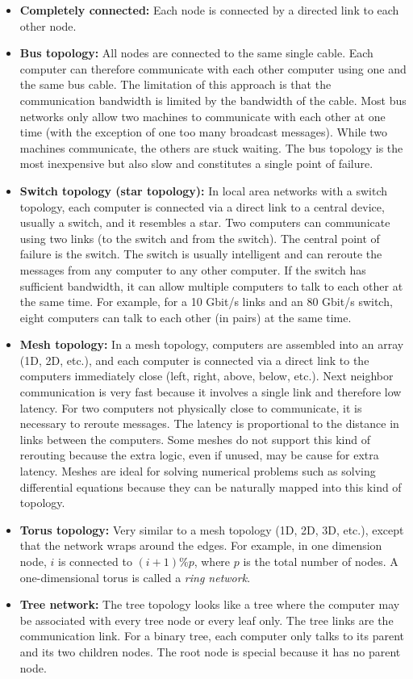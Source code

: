 \documentclass[justified,sixbynine]{tufte-book}
\theoremstyle{plain}%
\theoremstyle{definition}
\theoremstyle{remark}
\begin{document}
\begin{fullwidth}
\begin{itemize}
\item {\bf Completely connected:}
Each node is connected by a directed link to each other node.
\item {\bf Bus topology:}
All nodes are connected to the same single cable. Each computer can therefore communicate with each other computer using one and the same bus cable. The limitation of this approach is that the communication bandwidth is limited by the bandwidth of the cable. Most bus networks only allow two machines to communicate with each other at one time (with the exception of one too many broadcast messages). While two machines communicate, the others are stuck waiting.
The bus topology is the most inexpensive but also slow and constitutes a single point of failure.
\item {\bf Switch topology (star topology):}
In local area networks with a switch topology, each computer is connected via a direct link to a central device, usually a switch, and it resembles a star. Two computers can communicate using two links (to the switch and from the switch). The central point of failure is the switch. The switch is usually intelligent and can reroute the messages from any computer to any other computer. If the switch has sufficient bandwidth, it can allow multiple computers to talk to each other at the same time. For example, for a 10 Gbit/s links and an 80 Gbit/s switch, eight computers can talk to each other (in pairs) at the same time.
\item {\bf Mesh topology:}
In a mesh topology, computers are assembled into an array (1D, 2D, etc.), and each computer is connected via a direct link to the computers immediately close (left, right, above, below, etc.). Next neighbor communication is very fast because it involves a single link and therefore low latency. For two computers not physically close to communicate, it is necessary to reroute messages. The latency is proportional to the distance in links between the computers. Some meshes do not support this kind of rerouting because the extra logic, even if unused, may be cause for extra latency. Meshes are ideal for solving numerical problems such as solving differential equations because they can be naturally mapped into this kind of topology.
\item {\bf Torus topology:}
Very similar to a mesh topology (1D, 2D, 3D, etc.), except that the network wraps around the edges. For example, in one dimension node, $i$ is connected to $(i+1) \% p$, where $p$ is the total number of nodes. A one-dimensional torus is called a {\it ring network}.
\item {\bf Tree network:}
The tree topology looks like a tree where the computer may be associated with every tree node or every leaf only. The tree links are the communication link. For a binary tree, each computer only talks to its parent and its two children nodes. The root node is special because it has no parent node.


\end{itemize}
\end{fullwidth}
\end{document}
